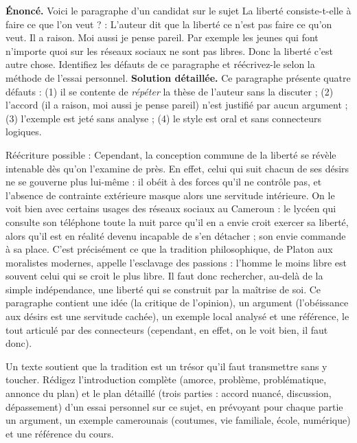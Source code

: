 \documentclass[11pt]{article}
\begin{document}
\begin{exoresolu}
\textbf{Énoncé.} Voici le paragraphe d'un candidat sur le sujet \og La liberté consiste-t-elle à faire ce que l'on veut ?\fg{} : \og L'auteur dit que la liberté ce n'est pas faire ce qu'on veut. Il a raison. Moi aussi je pense pareil. Par exemple les jeunes qui font n'importe quoi sur les réseaux sociaux ne sont pas libres. Donc la liberté c'est autre chose.\fg{} Identifiez les défauts de ce paragraphe et réécrivez-le selon la méthode de l'essai personnel.
\tcblower
\textbf{Solution détaillée.} Ce paragraphe présente quatre défauts : (1) il se contente de \emph{répéter} la thèse de l'auteur sans la discuter ; (2) l'accord (\og il a raison, moi aussi je pense pareil\fg{}) n'est justifié par aucun argument ; (3) l'exemple est jeté sans analyse ; (4) le style est oral et sans connecteurs logiques.

Réécriture possible : \og Cependant, la conception commune de la liberté se révèle intenable dès qu'on l'examine de près. En effet, celui qui suit chacun de ses désirs ne se gouverne plus lui-même : il obéit à des forces qu'il ne contrôle pas, et l'absence de contrainte extérieure masque alors une servitude intérieure. On le voit bien avec certains usages des réseaux sociaux au Cameroun : le lycéen qui consulte son téléphone toute la nuit \og parce qu'il en a envie\fg{} croit exercer sa liberté, alors qu'il est en réalité devenu incapable de s'en détacher ; son envie commande à sa place. C'est précisément ce que la tradition philosophique, de Platon aux moralistes modernes, appelle l'esclavage des passions : l'homme le moins libre est souvent celui qui se croit le plus libre. Il faut donc rechercher, au-delà de la simple indépendance, une liberté qui se construit par la maîtrise de soi.\fg{} Ce paragraphe contient une idée (la critique de l'opinion), un argument (l'obéissance aux désirs est une servitude cachée), un exemple local analysé et une référence, le tout articulé par des connecteurs (\og cependant\fg{}, \og en effet\fg{}, \og on le voit bien\fg{}, \og il faut donc\fg{}).
\end{exoresolu}

\begin{exercice}
Un texte soutient que \og la tradition est un trésor qu'il faut transmettre sans y toucher\fg{}. Rédigez l'introduction complète (amorce, problème, problématique, annonce du plan) et le plan détaillé (trois parties : accord nuancé, discussion, dépassement) d'un essai personnel sur ce sujet, en prévoyant pour chaque partie un argument, un exemple camerounais (coutumes, vie familiale, école, numérique) et une référence du cours.
\end{exercice}
\end{document}
